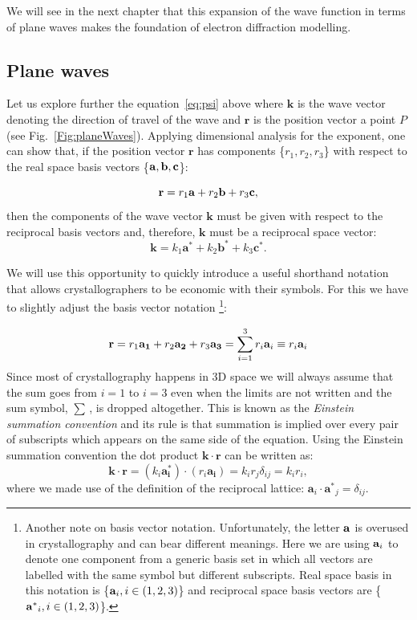 We will see in the next chapter that this expansion of the wave function in terms of plane waves makes the foundation of electron diffraction modelling. 


%
\subsection{Plane waves}
\label{sec:planeWave}
Let us explore further the equation~\ref{eq:psi} above where $\mathbf{k}$ is the wave vector denoting the direction of travel of the wave and $\mathbf{r}$ is the position vector a point $P$ (see Fig.~\ref{Fig:planeWaves}).
\def\symbola{a}
Applying dimensional analysis for the exponent, one can show that, if the position vector $\mathbf{r}$ has components \{$r_1, r_2, r_3$\} with respect to the real space basis vectors \{$\vb{a}, \vb{b}, \vb{c}$\}:

\begin{equation*}
\mathbf{r} = r_1 \vb{a}  + r_2 \vb{b}  + r_3 \vb{c} ,
\end{equation*}
then the components of the wave vector $\mathbf{k}$ must be given with respect to the reciprocal basis vectors and, therefore, $\mathbf{k}$ must be a reciprocal space vector:
\begin{equation*}
\mathbf{k} = k_1 \mathbf{a^*} + k_2 \mathbf{b^*} + k_3 \mathbf{c^*}.
\end{equation*}

We will use this opportunity to quickly introduce a useful shorthand notation that allows crystallographers to be economic with their symbols. For this we have to slightly adjust the basis vector notation \footnote{ Another note on basis vector notation. Unfortunately, the letter $\vb{a}$ is overused in crystallography and can bear different meanings. Here we are using $\vb{a}_i$ to denote one component from a generic basis set in which all vectors are labelled with the same symbol but different subscripts. Real space basis in this notation is \{$\vb{a}_i, i \in (1, 2, 3)$\} and reciprocal space basis vectors are \{$\vb{a^*}_i, i \in (1, 2, 3)$\}.}:

\begin{equation*}
\mathbf{r}= r_1\vb{a_1} +r_2\vb{a_2}+r_3\vb{a_3}=\sum_{i=1}^3r_i \vb{a}_i\equiv r_i \vb{a}_i
\end{equation*}
\label{par:Einstein}
Since most of crystallography happens in 3D space we will always assume that the sum goes from $i=1$ to $i=3$ even when the limits are not written and the sum symbol, $\sum \,$, is dropped altogether. This is known as the \textit{Einstein summation convention} and its rule is that summation is implied over every pair of subscripts which appears on the same side of the equation. Using the Einstein summation convention the dot product $\mathbf{k} \cdot \mathbf{r}$ can be written as:
\begin{equation*}
\mathbf{k} \cdot \mathbf{r} = (k_i \mathbf{a_i^*})\cdot (r_i \mathbf{a_i}) = k_i r_j \delta_{ij} = k_i r_i,
\end{equation*}
where we made use of the definition of the reciprocal lattice: $\mathbf{a}_i\cdot \mathbf{a^*}_j=\delta_{ij}$.


